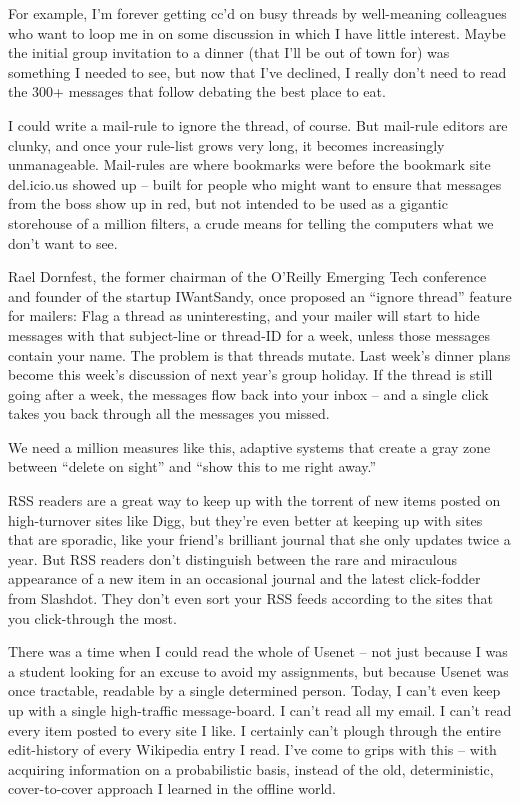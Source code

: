 For example, I'm forever getting cc'd on busy threads by
well-meaning colleagues who want to loop me in on some discussion
in which I have little interest. Maybe the initial group invitation
to a dinner (that I'll be out of town for) was something I needed
to see, but now that I've declined, I really don't need to read the
300+ messages that follow debating the best place to eat.

I could write a mail-rule to ignore the thread, of course. But
mail-rule editors are clunky, and once your rule-list grows very
long, it becomes increasingly unmanageable. Mail-rules are where
bookmarks were before the bookmark site del.icio.us showed up --
built for people who might want to ensure that messages from the
boss show up in red, but not intended to be used as a gigantic
storehouse of a million filters, a crude means for telling the
computers what we don't want to see.

Rael Dornfest, the former chairman of the O'Reilly Emerging Tech
conference and founder of the startup IWantSandy, once proposed an
``ignore thread'' feature for mailers: Flag a thread as
uninteresting, and your mailer will start to hide messages with
that subject-line or thread-ID for a week, unless those messages
contain your name. The problem is that threads mutate. Last week's
dinner plans become this week's discussion of next year's group
holiday. If the thread is still going after a week, the messages
flow back into your inbox -- and a single click takes you back
through all the messages you missed.

We need a million measures like this, adaptive systems that create
a gray zone between ``delete on sight'' and ``show this to me right
away.''

RSS readers are a great way to keep up with the torrent of new
items posted on high-turnover sites like Digg, but they're even
better at keeping up with sites that are sporadic, like your
friend's brilliant journal that she only updates twice a year. But
RSS readers don't distinguish between the rare and miraculous
appearance of a new item in an occasional journal and the latest
click-fodder from Slashdot. They don't even sort your RSS feeds
according to the sites that you click-through the most.

There was a time when I could read the whole of Usenet -- not just
because I was a student looking for an excuse to avoid my
assignments, but because Usenet was once tractable, readable by a
single determined person. Today, I can't even keep up with a single
high-traffic message-board. I can't read all my email. I can't read
every item posted to every site I like. I certainly can't plough
through the entire edit-history of every Wikipedia entry I read.
I've come to grips with this -- with acquiring information on a
probabilistic basis, instead of the old, deterministic,
cover-to-cover approach I learned in the offline world.

